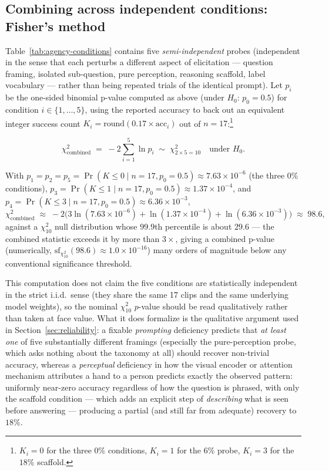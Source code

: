 \subsection{Combining across independent conditions: Fisher's method}

Table~\ref{tab:agency-conditions} contains five \emph{semi-independent}
probes (independent in the sense that each perturbs a different aspect of
elicitation --- question framing, isolated sub-question, pure perception,
reasoning scaffold, label vocabulary --- rather than being repeated trials
of the identical prompt). Let $p_i$ be the one-sided binomial p-value
computed as above (under $H_0{:}\,p_0=0.5$) for condition $i \in
\{1,\dots,5\}$, using the reported accuracy to back out an equivalent
integer success count $K_i = \mathrm{round}(0.17 \times \mathrm{acc}_i)$
out of $n=17$:\footnote{$K_i = 0$ for the three $0\%$ conditions, $K_i=1$
for the $6\%$ probe, $K_i=3$ for the $18\%$ scaffold.}

\begin{definition}
\[
  \chi^2_{\mathrm{combined}} \;=\; -2\sum_{i=1}^{5} \ln p_i \;\sim\; \chi^2_{2\times 5 = 10} \quad \text{under } H_0.
\]
\end{definition}

With $p_1=p_2=p_5 = \Pr(K\le 0\mid n{=}17,p_0{=}0.5) \approx 7.63\times10^{-6}$
(the three $0\%$ conditions),
$p_3 = \Pr(K\le 1\mid n{=}17,p_0{=}0.5) \approx 1.37\times10^{-4}$, and
$p_4 = \Pr(K\le 3\mid n{=}17,p_0{=}0.5) \approx 6.36\times10^{-3}$,
\[
  \chi^2_{\mathrm{combined}} \;\approx\; -2\big(3\ln(7.63\times10^{-6}) + \ln(1.37\times10^{-4}) + \ln(6.36\times10^{-3})\big) \;\approx\; 98.6,
\]
against a $\chi^2_{10}$ null distribution whose $99.9$th percentile is
about $29.6$ --- the combined statistic exceeds it by more than $3\times$,
giving a combined p-value (numerically, $\mathrm{sf}_{\chi^2_{10}}(98.6)
\approx 1.0\times10^{-16}$) many orders of magnitude below any conventional
significance threshold.

\begin{remark}
This computation does not claim the five conditions are statistically
independent in the strict i.i.d.\ sense (they share the same 17 clips and
the same underlying model weights), so the nominal $\chi^2_{10}$
$p$-value should be read qualitatively rather than taken at face value.
What it does formalize is the qualitative argument used in
Section~\ref{sec:reliability}: a fixable \emph{prompting} deficiency
predicts that \emph{at least one} of five substantially different framings
(especially the pure-perception probe, which asks nothing about the
taxonomy at all) should recover non-trivial accuracy, whereas a
\emph{perceptual} deficiency in how the visual encoder or attention
mechanism attributes a hand to a person predicts exactly the observed
pattern: uniformly near-zero accuracy regardless of how the question is
phrased, with only the scaffold condition --- which adds an explicit
step of \emph{describing} what is seen before answering --- producing a
partial (and still far from adequate) recovery to $18\%$.
\end{remark}

